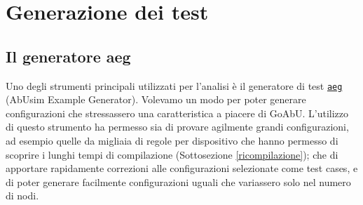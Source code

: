\documentclass[12pt, a4paper]{article}
\newcommand{\aeg}[0]{{\lstinline{aeg}}}
\begin{document}
\newpage

\section{Generazione dei test}

\subsection{Il generatore aeg}

Uno degli strumenti principali utilizzati per l'analisi è il generatore di test \href{https://github.com/KayJay7/abusim-example-generator}{\aeg} (AbUsim Example Generator). Volevamo un modo per poter generare configurazioni che stressassero una caratteristica a piacere di GoAbU. L'utilizzo di questo strumento ha permesso sia di provare agilmente grandi configurazioni, ad esempio quelle da migliaia di regole per dispositivo che hanno permesso di scoprire i lunghi tempi di compilazione (Sottosezione \ref{ricompilazione}); che di apportare rapidamente correzioni alle configurazioni selezionate come test cases, e di poter generare facilmente configurazioni uguali che variassero solo nel numero di nodi.
\end{document}
